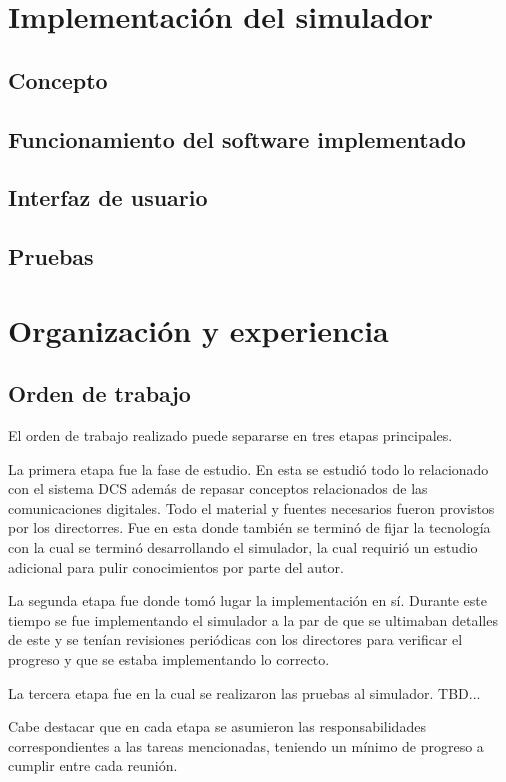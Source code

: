 \documentclass[a4paper,10pt]{article}
\begin{document}
\section{Implementación del simulador}
\subsection{Concepto}
\subsection{Funcionamiento del software implementado}
\subsection{Interfaz de usuario}
\subsection{Pruebas}

\section{Organización y experiencia}
\subsection{Orden de trabajo}
El orden de trabajo realizado puede separarse en tres etapas principales.
\par
La primera etapa fue la fase de estudio. En esta se estudió todo lo relacionado con el sistema DCS además de repasar conceptos relacionados de las comunicaciones digitales. Todo el material y fuentes necesarios fueron provistos por los directorres. Fue en
esta donde también se terminó de fijar la tecnología con la cual se terminó desarrollando el simulador, la cual requirió un estudio adicional para pulir conocimientos por parte del autor.
\par
La segunda etapa fue donde tomó lugar la implementación en sí. Durante este tiempo se fue implementando el simulador a la par de que se ultimaban detalles de este y se tenían revisiones periódicas con los directores para verificar el progreso y que se
estaba implementando lo correcto.
\par
La tercera etapa fue en la cual se realizaron las pruebas al simulador. TBD...
\par
Cabe destacar que en cada etapa se asumieron las responsabilidades correspondientes a las tareas mencionadas, teniendo un mínimo de progreso a cumplir entre cada reunión.
\end{document}

